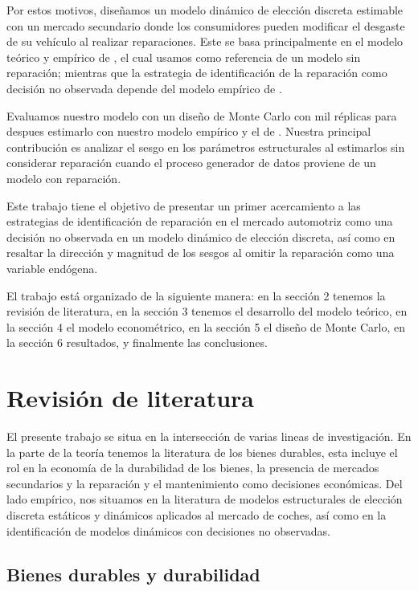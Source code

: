 \documentclass{article}
\begin{document}
Por estos motivos, diseñamos un modelo dinámico de elección discreta estimable con un mercado secundario donde los consumidores pueden modificar el desgaste de su vehículo al realizar reparaciones. Este se basa principalmente en el modelo teórico y empírico de \textcite{Gillingham2022}, el cual usamos como referencia de un modelo sin reparación; mientras que la estrategia de identificación de la reparación como decisión no observada depende del modelo empírico de \textcite{HuXin2024}.

Evaluamos nuestro modelo con un diseño de Monte Carlo con mil réplicas para despues estimarlo con nuestro modelo empírico y el de \textcite{Gillingham2022}. Nuestra principal contribución es analizar el sesgo en los parámetros estructurales al estimarlos sin considerar reparación cuando el proceso generador de datos proviene de un modelo con reparación. 

Este trabajo tiene el objetivo de presentar un primer acercamiento a las estrategias de identificación de reparación en el mercado automotriz como una decisión no observada en un modelo dinámico de elección discreta, así como en resaltar la dirección y magnitud de los sesgos al omitir la reparación como una variable endógena.

El trabajo está organizado de la siguiente manera: en la sección 2 tenemos la revisión de literatura, en la sección 3 tenemos el desarrollo del modelo teórico, en la sección 4 el modelo econométrico, en la sección 5 el diseño de Monte Carlo, en la sección 6 resultados, y finalmente las conclusiones.


\section{Revisión de literatura}




El presente trabajo se situa en la intersección de varias lineas de investigación. En la parte de la teoría tenemos la literatura de los bienes durables, esta incluye el rol en la economía de la durabilidad de los bienes, la presencia de mercados secundarios y la reparación y el mantenimiento como decisiones económicas. Del lado empírico, nos situamos en la literatura de modelos estructurales de elección discreta estáticos y dinámicos aplicados al mercado de coches, así como en la identificación de modelos dinámicos con decisiones no observadas.

\subsection{Bienes durables y durabilidad}
\end{document}
